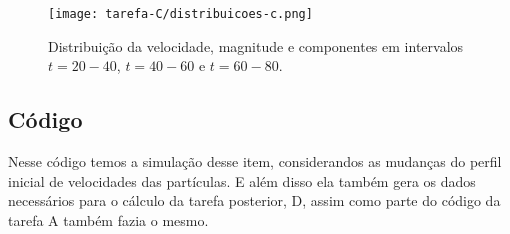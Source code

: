 
\begin{figure}[h!]
    \centering
    \texttt{[image: tarefa-C/distribuicoes-c.png]}
    \caption{Distribuição da velocidade, magnitude e componentes em intervalos $t=20-40$, $t=40-60$ e $t=60-80$.}
    \label{fig:distribuicoes-velocidade-c}
\end{figure}



\subsection*{Código}
Nesse código temos a simulação desse item, considerandos as mudanças do perfil inicial de velocidades 
das partículas. E além disso ela também gera os dados necessários para o cálculo da tarefa posterior, D, assim 
como parte do código da tarefa A também fazia o mesmo.

\clearpage